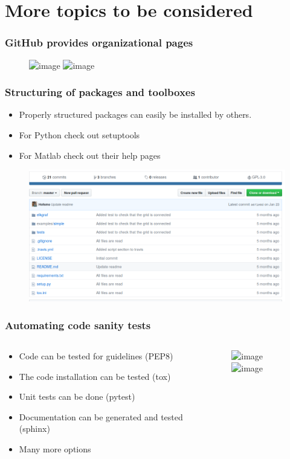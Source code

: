 \section[More topics]{More topics to be considered}
\begin{frame}
	\frametitle{GitHub provides organizational pages}
	\begin{figure}
		\includegraphics<1>[width=\textwidth]{./pictures/kth.png}
		\includegraphics<2>[width=\textwidth]{./pictures/alsetlab.png}
	\end{figure}
\end{frame}
\begin{frame}
	\frametitle{Structuring of packages and toolboxes}
		\begin{itemize}
			\item Properly structured packages can easily be installed by others.
			\item For Python check out setuptools
			\item For Matlab check out their help pages
		\end{itemize}
	\begin{figure}
		\includegraphics[width=\textwidth]{./pictures/structure.png}
	\end{figure}
\end{frame}
\begin{frame}
	\frametitle{Automating code sanity tests}
	\begin{columns}
		\begin{column}{0.5\textwidth}
			\begin{itemize}
				\item Code can be tested for guidelines (PEP8)
				\item The code installation can be tested (tox)
				\item Unit tests can be done (pytest)
				\item Documentation can be generated and tested (sphinx)
				\item Many more options
			\end{itemize}
		\end{column}
		\begin{column}{0.5\textwidth}
			\begin{figure}
				\includegraphics<1>[width=\textwidth]{./pictures/travis.png}
				\includegraphics<2>[width=\textwidth]{./pictures/pandapower.png}
			\end{figure}
		\end{column}
	\end{columns}
\end{frame}

